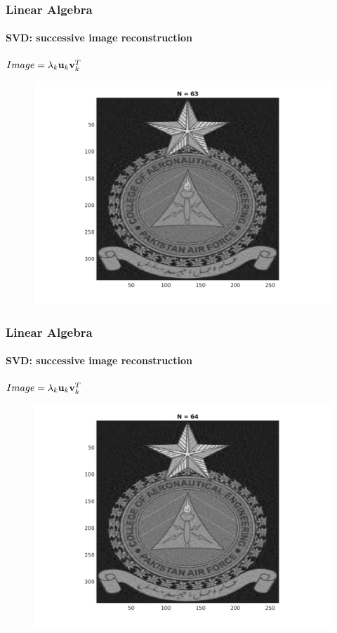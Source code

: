 \documentclass[hyperref={pdfpagelabels=true}]{beamer}
\begin{document}
\begin{frame}
\frametitle{Linear Algebra}
\framesubtitle{SVD: successive image reconstruction} 
\small{
\begin{center}
$Image = \lambda_k{\bf u}_k {\bf v}_k^T$
\end{center}}
\begin{figure}[!htb]
\centering
\includegraphics [scale=0.48]{n/b63.png}
\end{figure}
\end{frame}

\begin{frame}
\frametitle{Linear Algebra}
\framesubtitle{SVD: successive image reconstruction} 
\small{
\begin{center}
$Image = \lambda_k{\bf u}_k {\bf v}_k^T$
\end{center}}
\begin{figure}[!htb]
\centering
\includegraphics [scale=0.48]{n/b64.png}
\end{figure}
\end{frame}
\end{document}
